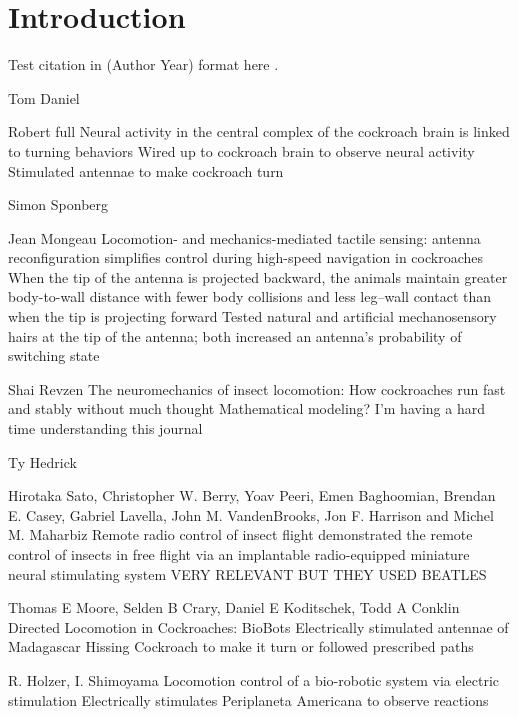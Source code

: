 \section{Introduction}

Test citation in (Author Year) format here \citep{buck2020go}. 


Tom Daniel

Robert full
Neural activity in the central complex of the cockroach brain is linked to turning behaviors 
Wired up to cockroach brain to observe neural activity
Stimulated antennae to make cockroach turn

Simon Sponberg

Jean Mongeau
Locomotion- and mechanics-mediated tactile sensing: antenna reconfiguration simplifies control during high-speed navigation in cockroaches
When the tip of the antenna is projected backward, the animals maintain greater body-to-wall distance with fewer body collisions and less leg–wall contact than when the tip is projecting forward
Tested natural and artificial mechanosensory hairs at the tip of the antenna; both  increased an antenna's probability of switching state

Shai Revzen
The neuromechanics of insect locomotion: How cockroaches run fast and stably without much thought
Mathematical modeling? I’m having a hard time understanding this journal

Ty Hedrick

Hirotaka Sato, Christopher W. Berry, Yoav Peeri, Emen Baghoomian, Brendan E. Casey, Gabriel Lavella, John M. VandenBrooks, Jon F. Harrison and Michel M. Maharbiz
Remote radio control of insect flight
demonstrated the remote control of insects in free flight via an implantable radio-equipped miniature neural stimulating system
VERY RELEVANT BUT THEY USED BEATLES %

Thomas E Moore, Selden B Crary, Daniel E Koditschek, Todd A Conklin
Directed Locomotion in Cockroaches: BioBots
Electrically stimulated antennae of Madagascar Hissing Cockroach to make it turn or followed prescribed paths

R. Holzer, I. Shimoyama
Locomotion control of a bio-robotic system via electric stimulation
Electrically stimulates Periplaneta Americana to observe reactions

